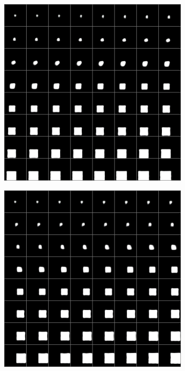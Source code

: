 \documentclass[10pt,a4paper]{article}
\begin{document}
\begin{figure}[!ht]
\begin{subfigure}{0.49\textwidth}
	\caption{}
	\label{fig1:subim2}
\end{subfigure}
\begin{subfigure}{0.49\textwidth}
	\centering	
	\includegraphics[width=\textwidth ] {square_interpolation_y.png}
	\caption{}
	\label{fig1:subim3}
\end{subfigure}
\begin{subfigure}{0.49\textwidth}
	\centering	
	\includegraphics[width=\textwidth] {square_interpolation_z.png}

\end{subfigure}
\end{figure}
\end{document}
